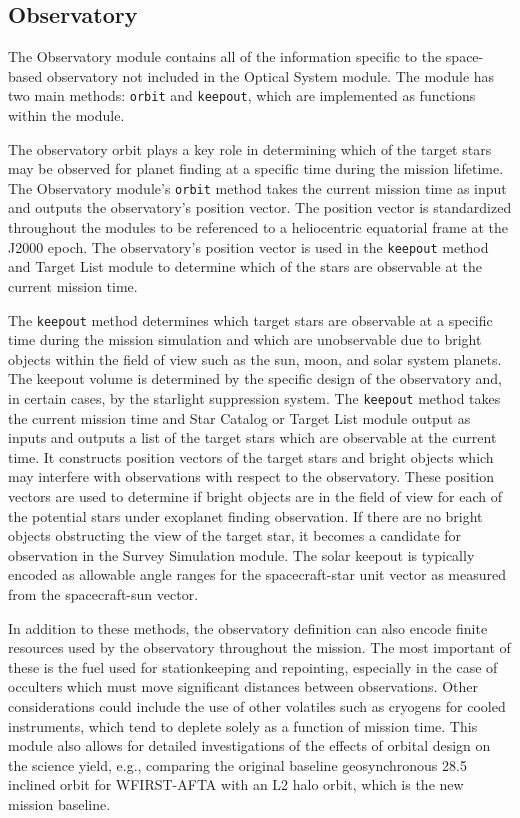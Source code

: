 \documentclass[cleanfoot]{asme2ej}
\begin{document}

\subsection{Observatory}
The Observatory module contains all of the information specific to the space-based observatory not included in the Optical System module. The module has two main methods: \verb+orbit+ and \verb+keepout+, which are implemented as functions within the module. 

The observatory orbit plays a key role in determining which of the target stars may be observed for planet finding at a specific time during the mission lifetime. The Observatory module's \verb+orbit+ method takes the current mission time as input and outputs the observatory's position vector. The position vector is standardized throughout the modules to be referenced to a heliocentric equatorial frame at the J2000 epoch. The observatory's position vector is used in the \verb+keepout+ method and Target List module to determine which of the stars are observable at the current mission time.

The \verb+keepout+ method determines which target stars are observable at a specific time during the mission simulation and which are unobservable due to bright objects within the field of view such as the sun, moon, and solar system planets.  The keepout volume is determined by the specific design of the observatory and, in certain cases, by the starlight suppression system.  The \verb+keepout+ method takes the current mission time and Star Catalog or Target List module output as inputs and outputs a list of the target stars which are observable at the current time. It constructs position vectors of the target stars and bright objects which may interfere with observations with respect to the observatory. These position vectors are used to determine if bright objects are in the field of view for each of the potential stars under exoplanet finding observation.  If there are no bright objects obstructing the view of the target star, it becomes a candidate for observation in the Survey Simulation module.  The solar keepout is typically encoded as allowable angle ranges for the spacecraft-star unit vector as measured from the spacecraft-sun vector.

In addition to these methods, the observatory definition can also encode finite resources used by the observatory throughout the mission.  The most important of these is the fuel used for stationkeeping and repointing, especially in the case of occulters which must move significant distances between observations.  Other considerations could include the use of other volatiles such as cryogens for cooled instruments, which tend to deplete solely as a function of mission time.  This module also allows for detailed investigations of the effects of orbital design on the science yield, e.g., comparing the original baseline geosynchronous 28.5\textdegree{} inclined orbit for WFIRST-AFTA with an L2 halo orbit, which is the new mission baseline. 
\end{document}
